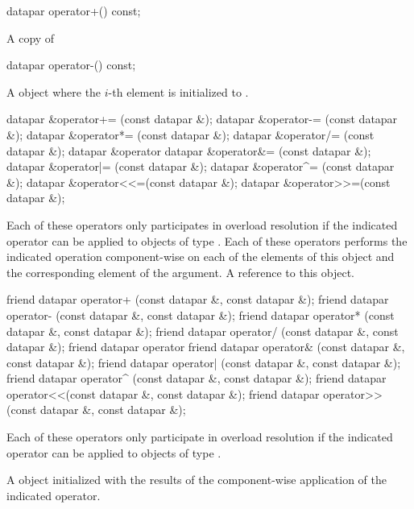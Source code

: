 \begin{itemdecl}
datapar operator+() const;
\end{itemdecl}
\begin{itemdescr}
  \pnum \returns A copy of 
\end{itemdescr}

\begin{itemdecl}
datapar operator-() const;
\end{itemdecl}
\begin{itemdescr}
  \pnum\returns A \datapar object where the $i$-th element is initialized to  \foralli.
\end{itemdescr}

\begin{itemdecl}
datapar &operator+= (const datapar &);
datapar &operator-= (const datapar &);
datapar &operator*= (const datapar &);
datapar &operator/= (const datapar &);
datapar &operator%
datapar &operator&= (const datapar &);
datapar &operator|= (const datapar &);
datapar &operator^= (const datapar &);
datapar &operator<<=(const datapar &);
datapar &operator>>=(const datapar &);
\end{itemdecl}
\begin{itemdescr}
  \pnum\remarks Each of these operators only participates in overload resolution if the indicated operator can be applied to objects of type .
  \pnum\effects Each of these operators performs the indicated operation component-wise on each of the elements of this object and the corresponding element of the argument.
  \pnum\returns A reference to this object.
\end{itemdescr}


\begin{itemdecl}
friend datapar operator+ (const datapar &, const datapar &);
friend datapar operator- (const datapar &, const datapar &);
friend datapar operator* (const datapar &, const datapar &);
friend datapar operator/ (const datapar &, const datapar &);
friend datapar operator%
friend datapar operator& (const datapar &, const datapar &);
friend datapar operator| (const datapar &, const datapar &);
friend datapar operator^ (const datapar &, const datapar &);
friend datapar operator<<(const datapar &, const datapar &);
friend datapar operator>>(const datapar &, const datapar &);
\end{itemdecl}
\begin{itemdescr}
  \pnum\remarks Each of these operators only participate in overload resolution if the indicated operator can be applied to objects of type .

  \pnum\returns A \datapar object initialized with the results of the component-wise application of the indicated operator.
\end{itemdescr}

